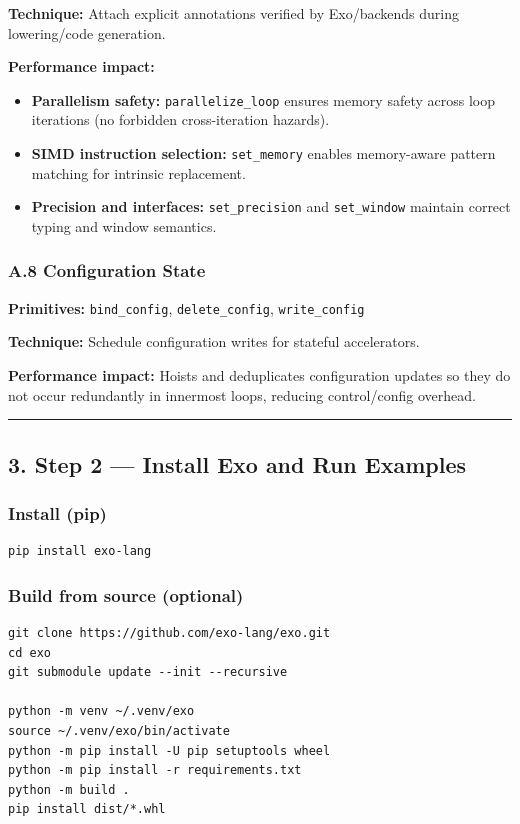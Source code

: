 \textbf{Technique:} Attach explicit annotations verified by Exo/backends during lowering/code generation.

\textbf{Performance impact:}
\begin{itemize}
  \item \textbf{Parallelism safety:} \texttt{parallelize\_loop} ensures memory safety across loop iterations (no forbidden cross-iteration hazards).
  \item \textbf{SIMD instruction selection:} \texttt{set\_memory} enables memory-aware pattern matching for intrinsic replacement.
  \item \textbf{Precision and interfaces:} \texttt{set\_precision} and \texttt{set\_window} maintain correct typing and window semantics.
\end{itemize}

\hypertarget{a.8-configuration-state}{%
\subsubsection{A.8 Configuration State}\label{a.8-configuration-state}}

\textbf{Primitives:} \texttt{bind\_config}, \texttt{delete\_config}, \texttt{write\_config}

\textbf{Technique:} Schedule configuration writes for stateful accelerators.

\textbf{Performance impact:} Hoists and deduplicates configuration updates so they do not occur redundantly in innermost loops, reducing control/config overhead.

\begin{center}\rule{0.5\linewidth}{0.5pt}\end{center}

\hypertarget{step-2-install-exo-and-run-examples}{%
\subsection{3. Step 2 --- Install Exo and Run Examples}\label{step-2-install-exo-and-run-examples}}

\subsubsection{Install (pip)}
\begin{verbatim}
pip install exo-lang
\end{verbatim}

\subsubsection{Build from source (optional)}
\begin{verbatim}
git clone https://github.com/exo-lang/exo.git
cd exo
git submodule update --init --recursive

python -m venv ~/.venv/exo
source ~/.venv/exo/bin/activate
python -m pip install -U pip setuptools wheel
python -m pip install -r requirements.txt
python -m build .
pip install dist/*.whl
\end{verbatim}

